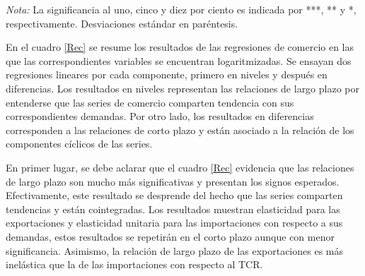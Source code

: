 \documentclass[12pt,letterpaper]{article}
\begin{document}
\begin{table}
\caption{Regresiones de Comercio}
\begin{center}
\end{center}
\begin{scriptsize}
\emph{Nota:} La significancia al uno, cinco y diez por ciento es indicada por ***, ** y *, respectivamente. Desviaciones estándar en paréntesis.
\end{scriptsize}								
\label{Rec}	
\end{table}	

En el cuadro \ref{Rec} se resume los resultados de las regresiones de comercio en las que las correspondientes variables se encuentran logaritmizadas. Se ensayan dos regresiones lineares por cada componente, primero en niveles y después en diferencias. Los resultados en niveles representan las relaciones de largo plazo por entenderse que las series de comercio comparten tendencia con sus correspondientes demandas. Por otro lado, los resultados en diferencias corresponden a las relaciones de corto plazo y están asociado a la relación de los componentes cíclicos de las series.

En primer lugar, se debe aclarar que el cuadro \ref{Rec} evidencia que las relaciones de largo plazo son mucho más significativas y presentan los signos esperados. Efectivamente, este resultado se desprende del hecho que las series comparten tendencias y están cointegradas. Los resultados muestran elasticidad para las exportaciones y elasticidad unitaria para las importaciones con respecto a sus demandas, estos resultados se repetirán en el corto plazo aunque con menor significancia. Asimismo, la relación de largo plazo de las exportaciones es más inelástica que la de las importaciones con respecto al TCR.
\end{document}

